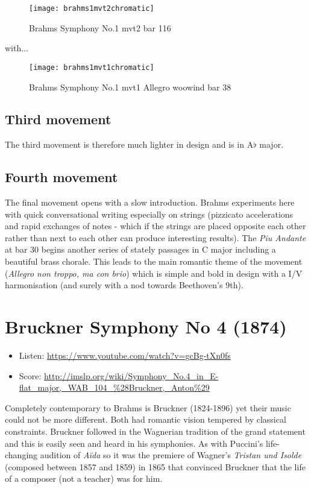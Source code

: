 \begin{figure}[H]
\centering
\texttt{[image: brahms1mvt2chromatic]}\caption{Brahms Symphony No.1 mvt2 bar 116}
\label{fig:b1m2chromatic}
\end{figure}

with...

\begin{figure}[H]
\centering
\texttt{[image: brahms1mvt1chromatic]}\caption{Brahms Symphony No.1 mvt1 Allegro woowind bar 38}
\label{fig:b1m2chromatic}
\end{figure}

\subsection{Third movement}
The third movement is therefore much lighter in design and is in A$\flat$ major.

\subsection{Fourth movement}
The final movement opens with a slow introduction. Brahms experiments here with quick conversational writing especially on strings (pizzicato accelerations and rapid exchanges of notes - which if the strings are placed opposite each other rather than next to each other can produce interesting results). The \textit{Piu Andante} at bar 30 begins another series of stately passages in C major including a beautiful brass chorale. This leads to the main romantic theme of the movement (\textit{Allegro non troppo, ma con brio}) which is simple and bold in design with a I/V harmonisation (and surely with a nod towards Beethoven's 9th).  


\section{Bruckner Symphony No 4 (1874)}
\begin{itemize}
\item Listen: \url{https://www.youtube.com/watch?v=gcBg-tXn0fs}
\item Score: \url{http://imslp.org/wiki/Symphony_No.4_in_E-flat_major,_WAB_104_%28Bruckner,_Anton%29}
\end{itemize}

Completely contemporary to Brahms is Bruckner (1824-1896) yet their music could not be more different. Both had romantic vision tempered by classical constraints. Bruckner followed in the Wagnerian tradition of the grand statement and this is easily seen and heard in his symphonies. As with Puccini's life-changing audition of \textit{A\"ida} so it was the premiere of Wagner's \textit{Tristan und Isolde} (composed between 1857 and 1859) in 1865 that convinced Bruckner that the life of a composer (not a teacher) was for him. 

